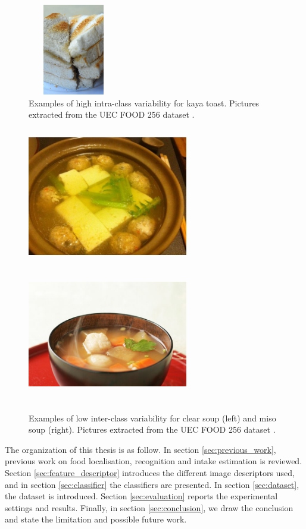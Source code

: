 \begin{figure}
    \includegraphics[height=4cm, width=4cm]{img/kaya_toast_6.jpg}
    \caption[Examples of high intra-class variability for kaya toast]{Examples of high intra-class variability for kaya toast. Pictures extracted from the UEC FOOD 256 dataset \cite{Kawano2015}.}
    \label{fig:intra-class_variability}
\end{figure}

\begin{figure}
    \centering
    \includegraphics[width=7cm, height=6cm]{img/clear_soup.jpg}
    \includegraphics[width=7cm, height=6cm]{img/miso_soup.jpg}
    \caption[Examples of low inter-class variability for kaya toast]{Examples of low inter-class variability for clear soup (left) and miso soup (right). Pictures extracted from the UEC FOOD 256 dataset \cite{Kawano2015}.}
    \label{fig:inter-class_variability}
\end{figure}

The organization of this thesis is as follow. In section \ref{sec:previous_work}, previous work on food localisation, recognition and intake estimation is reviewed. Section \ref{sec:feature_descriptor} introduces the different image descriptors used, and in section \ref{sec:classifier} the classifiers are presented. In section \ref{sec:dataset}, the dataset is introduced. Section \ref{sec:evaluation} reports the experimental settings and results. Finally, in section \ref{sec:conclusion}, we draw the conclusion and state the limitation and possible future work.

